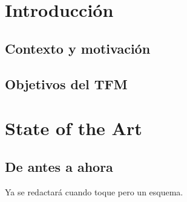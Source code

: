 \documentclass[11pt,a4paper]{article}
\begin{document}


\vspace{0.4cm}

\tableofcontents

\clearpage

\section{Introducción}
\subsection{Contexto y motivación}
\subsection{Objetivos del TFM}

\section{State of the Art}
\subsection{De antes a ahora}
Ya se redactará cuando toque pero un esquema.
\end{document}

